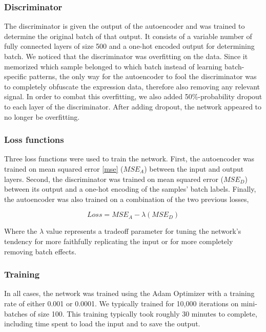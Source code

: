 \documentclass[notitlepage]{article}
\begin{document}
\subsubsection{Discriminator}

The discriminator is given the output of the autoencoder and was trained to determine the original batch of that output.
It consists of a variable number of fully connected layers of size 500 and a one-hot encoded output for determining batch.
We noticed that the discriminator was overfitting on the data.
Since it memorized which sample belonged to which batch instead of learning batch-specific patterns, the only way for the autoencoder to fool the discriminator was to completely obfuscate the expression data, therefore also removing any relevant signal.
In order to combat this overfitting, we also added 50\%-probability dropout to each layer of the discriminator.
After adding dropout, the network appeared to no longer be overfitting.

\subsubsection{Loss functions}

Three loss functions were used to train the network.
First, the autoencoder was trained on mean squared error \ref{mse} ($MSE_A$) between the input and output layers.
Second, the discriminator was trained on mean squared error ($MSE_D$) between its output and a one-hot encoding of the samples' batch labels.
Finally, the autoencoder was also trained on a combination of the two previous losses,

\begin{equation}
	\label{dual_loss}
	Loss = MSE_A - \lambda{}(MSE_D)
\end{equation}

Where the $\lambda$ value represents a tradeoff parameter for tuning the network's tendency for more faithfully replicating the input or for more completely removing batch effects.

\subsubsection{Training}

In all cases, the network was trained using the Adam Optimizer \cite{kingma_adam_2014} with a training rate of either 0.001 or 0.0001.
We typically trained for 10,000 iterations on mini-batches of size 100.
This training typically took roughly 30 minutes to complete, including time spent to load the input and to save the output.
\end{document}
